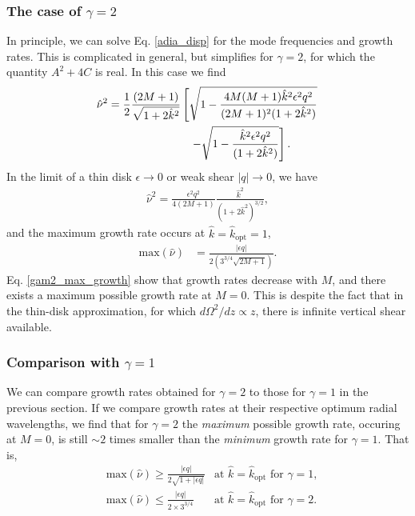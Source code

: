 \subsubsection{The case of $\gamma=2$}
In principle, we can solve Eq. \ref{adia_disp} for the mode
frequencies and growth rates. This is complicated in 
general, but simplifies for $\gamma=2$, for which the quantity
$A^2+4C$ is real. In this case we find
\begin{align}
  \hat{\nu}^2 =
  \frac{1}{2}\frac{(2M+1)}{\sqrt{1+2\hat{k}^2}}&\left[
    \sqrt{1-\frac{4M(M+1)\hat{k}^2\epsilon^2q^2}{(2M+1)^2(1+2\hat{k}^2)}}\right.\notag\\
  &\phantom{=}
  \left.- \sqrt{1 - \frac{\hat{k}^2\epsilon^2q^2}{(1+2\hat{k}^2)}}\right].
\end{align}
In the limit of a thin disk $\epsilon\to0$ or weak shear $|q|\to0$, we
have
\begin{align}
  \hat{\nu}^2 = \frac{\epsilon^2
    q^2}{4(2M+1)}\frac{\hat{k}^2}{(1+2\hat{k}^2)^{3/2}},\label{gam2_growth}
\end{align}
and the maximum growth rate occurs at $\hat{k}=\hat{k}_\mathrm{opt}=1$,  
\begin{align}
  \mathrm{max}(\hat{\nu}) &= \frac{|\epsilon
    q|}{2(3^{3/4}\sqrt{2M+1})}\label{gam2_max_growth}.
\end{align}
Eq. \ref{gam2_max_growth} show that growth rates decrease with $M$,
and there exists a maximum possible growth rate at $M=0$. This is
despite the fact that in the thin-disk approximation, for which
$d\Omega^2/dz\propto z$, there is infinite vertical shear
available.  

\subsubsection{Comparison with $\gamma=1$}
We can compare growth rates obtained for $\gamma=2$ to those for
$\gamma=1$ in the previous section. If we compare growth rates at their 
respective optimum radial wavelengths, we find
that for $\gamma=2$ the \emph{maximum} possible growth rate, occuring
at $M=0$, is still $\sim2$ times smaller than the \emph{minimum} growth
rate for $\gamma=1$. That is,
\begin{align}
  &\mathrm{max}(\hat{\nu}) \geq \frac{|\epsilon q|}{2\sqrt{1+|\epsilon
      q|}} & \text{at }\hat{k} = \hat{k}_\mathrm{opt} \text{ for }   \gamma=1,  \\
  &\mathrm{max}(\hat{\nu}) \leq \frac{|\epsilon q|}{2\times 3^{3/4}}
           & \text{at }\hat{k} = \hat{k}_\mathrm{opt} \text{ for } \gamma=2.
\end{align}


